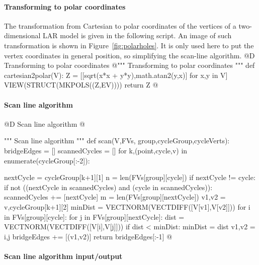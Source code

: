 \documentclass[11pt,oneside]{article}    %
\begin{document}
\paragraph{Transforming to polar coordinates}

The transformation from Cartesian to polar coordinates of the vertices of a two-dimensional LAR model is given in the following script. An image of such transformation is shown in Figure~\ref{fig:polarholes}. It is only used here to put the vertex coordinates in general position, so simplifying the scan-line algorithm.
@D Transforming to polar coordinates 
@{""" Transforming to polar coordinates """
def cartesian2polar(V):    
    Z = [[sqrt(x*x + y*y),math.atan2(y,x)] for x,y in V]
    VIEW(STRUCT(MKPOLS((Z,EV))))
    return Z
@}


\paragraph{Scan line algorithm}
@D Scan line algorithm 
@{""" Scan line algorithm """
def scan(V,FVs, group,cycleGroup,cycleVerts):
    bridgeEdges = []
    scannedCycles = []
    for k,(point,cycle,v) in enumerate(cycleGroup[:-2]):
        
        nextCycle = cycleGroup[k+1][1]
        n = len(FVs[group][cycle])
        if nextCycle != cycle: 
            if not ((nextCycle in scannedCycles) and (cycle in scannedCycles)):
                scannedCycles += [nextCycle]
                m = len(FVs[group][nextCycle])
                v1,v2 = v,cycleGroup[k+1][2]
                minDist = VECTNORM(VECTDIFF([V[v1],V[v2]]))
                for i in FVs[group][cycle]:
                    for j in FVs[group][nextCycle]:
                        dist = VECTNORM(VECTDIFF([V[i],V[j]]))
                        if  dist < minDist: 
                            minDist = dist
                            v1,v2 = i,j
                bridgeEdges += [(v1,v2)]
    return bridgeEdges[:-1]
@}

\paragraph{Scan line algorithm input/output}
\end{document}
